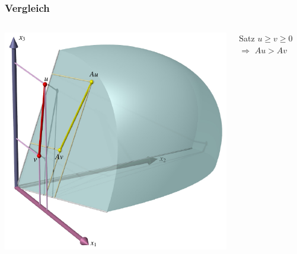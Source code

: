 %
%
%
\bgroup
\begin{frame}[t]
\setlength{\abovedisplayskip}{5pt}
\setlength{\belowdisplayskip}{5pt}
\frametitle{Vergleich}

\vspace{-20pt}
\begin{columns}[t,onlytextwidth]
\begin{column}{0.57\textwidth}
\begin{center}
\includegraphics[width=\textwidth]{../../buch/chapters/80-wahrscheinlichkeit/images/vergleich.pdf}
\end{center}
\end{column}
\begin{column}{0.38\textwidth}
\begin{block}{Satz}
$u\ge v\ge 0$ $\Rightarrow$ $Au>Av$
\end{block}
\end{column}
\end{columns}
\end{frame}
\egroup
